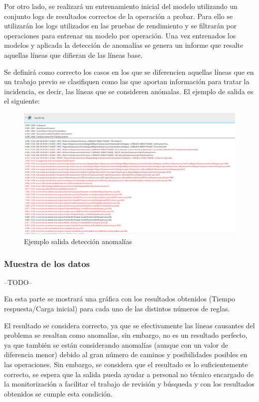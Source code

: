 Por otro lado, se realizará un entrenamiento inicial del modelo utilizando un conjunto logs de resultados correctos de la operación a probar. Para ello se utilizarán los logs utilizados en las pruebas de rendimiento y se filtrarán por operaciones para entrenar un modelo por operación. Una vez entrenados los modelos y aplicada la detección de anomalías se genera un informe que resalte aquellas líneas que difieran de las líneas base. 

Se definirá como correcto los casos en los que se diferencien aquellas líneas que en un trabajo previo se clasifiquen como las que aportan información para tratar la incidencia, es decir, las líneas que se consideren anómalas. El ejemplo de salida es el siguiente:

\begin{figure}[H]
\centerline{\includegraphics[width=15cm]{figuras/report.png}}
\caption{Ejemplo salida detección anomalías}
\label{enlace1}
\end{figure}

\subsubsection{Muestra de los datos}

--TODO--

En esta parte se mostrará una gráfica con los resultados obtenidos (Tiempo respuesta/Carga inicial) para cada uno de las distintos números de reglas.



El resultado se considera correcto, ya que se efectivamente las líneas causantes del problema se resaltan como anomalías, sin embargo, no es un resultado perfecto, ya que también se están considerando anomalías (aunque con un valor de diferencia menor) debido al gran número de caminos y posibilidades posibles en las operaciones. Sin embargo, se considera que el resultado es lo suficientemente correcto, se espera que la salida pueda ayudar a personal no técnico encargado de la monitorización a facilitar el trabajo de revisión y búsqueda y con los resultados obtenidos se cumple esta condición.


